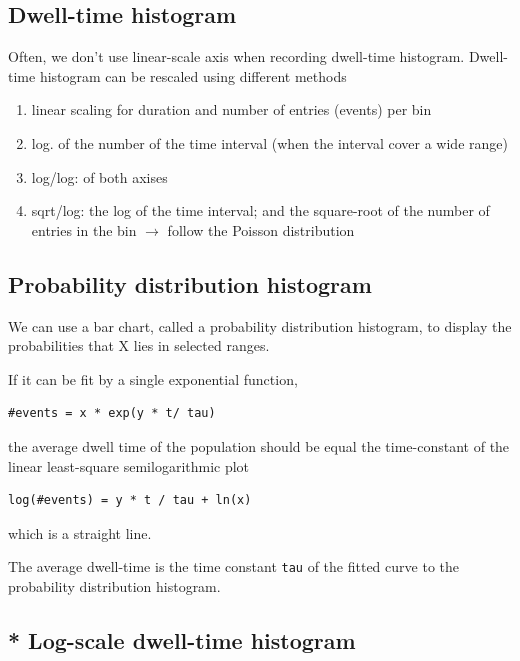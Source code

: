 \subsection{Dwell-time histogram}
\label{sec:dwell-time-histogram}

Often, we don't use linear-scale axis when recording dwell-time
histogram. Dwell-time histogram can be rescaled using different methods
\begin{enumerate}

\item linear scaling for duration and number of entries (events) per
  bin

\item log. of the number of the time interval (when the interval
  cover a wide range)

\item log/log: of both axises

\item sqrt/log: the log of the time interval; and the square-root of
  the number of entries in the bin $\rightarrow$ follow the Poisson
  distribution~\citep{sigworth1987dti}
\end{enumerate}

\subsection{Probability distribution histogram}

We can use a bar chart, called a probability distribution histogram, to display
the probabilities that X lies in selected ranges.

If it can be fit by a single exponential function,
\begin{verbatim}
#events = x * exp(y * t/ tau)
\end{verbatim}
the average dwell time of the population should be equal the time-constant of
the linear least-square semilogarithmic plot
\begin{verbatim}
log(#events) = y * t / tau + ln(x)
\end{verbatim}
which is a straight line.

The average dwell-time is the time constant \verb!tau! of the fitted curve to
the probability distribution histogram.


\subsection{* Log-scale dwell-time histogram}
\label{sec:dwell-time-histogram-linear-y-log-x}


